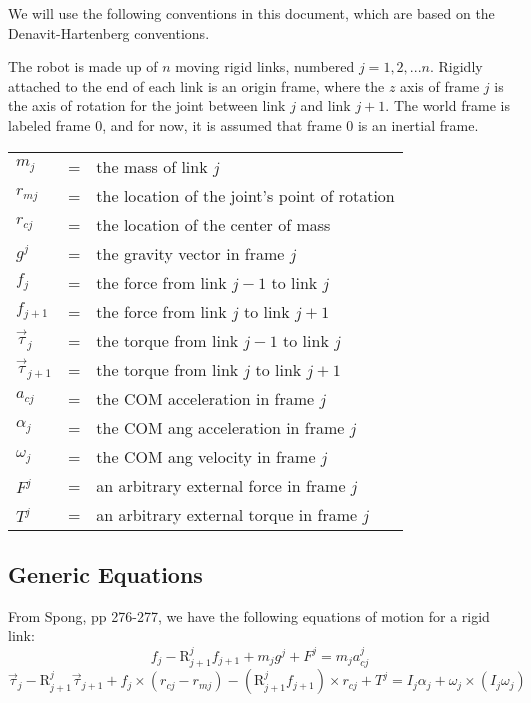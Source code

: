 \documentclass[letterpaper,12pt]{article}
\newcommand{\R}[2]{{\mbox{R}}^{#1}_{#2}}
\begin{document}
      We will use the following conventions in this document,
      which are based on the Denavit-Hartenberg conventions.
      
      The robot is made up of $n$ moving rigid links,
      numbered $j=1,2,...n$.  Rigidly attached to the end of each link
      is an origin frame, where the $z$ axis of frame $j$ is the axis
      of rotation for the joint between link $j$ and link $j+1$.
      The world frame is labeled frame $0$, and for now, it is assumed
      that frame $0$ is an inertial frame.
      
      \begin{center}
      \begin{tabular}{lcl}
         \hline
         $m_j$            &=& the mass of link $j$ \\
         $r_{mj}$         &=& the location of the joint's point of rotation \\
         $r_{cj}$         &=& the location of the center of mass \\
         $g^j$       &=& the gravity vector in frame $j$ \\
         $f_j$            &=& the force from link $j-1$ to link $j$ \\
         $f_{j+1}$        &=& the force from link $j$ to link $j+1$ \\
         $\vec\tau_j$     &=& the torque from link $j-1$ to link $j$ \\
         $\vec\tau_{j+1}$ &=& the torque from link $j$ to link $j+1$ \\
         $a_{cj}$         &=& the COM acceleration in frame $j$ \\
         $\alpha_j$       &=& the COM ang acceleration in frame $j$ \\
         $\omega_j$       &=& the COM ang velocity in frame $j$ \\
         $F^j$       &=& an arbitrary external force in frame $j$ \\
         $T^j$       &=& an arbitrary external torque in frame $j$ \\
         \hline
      \end{tabular}
      \end{center}
    
    \newpage
    \subsection{Generic Equations}
    
      From Spong, pp 276-277, we have the following equations of motion for a
      rigid link:
      \begin{equation}
         f_j - \R{j}{j+1} f_{j+1} + m_j g^j + F^j
            = m_j a_{cj}^j
      \end{equation}
      \begin{equation}
         \vec\tau_j - \R{j}{j+1} \vec\tau_{j+1}
            + f_j \times \left( r_{cj} - r_{mj} \right)
            - \left( \R{j}{j+1} f_{j+1} \right) \times {r_{cj}}
            + T^j
            = I_j \alpha_j + \omega_j \times \left( I_j \omega_j \right)
      \end{equation}
   
\end{document}

